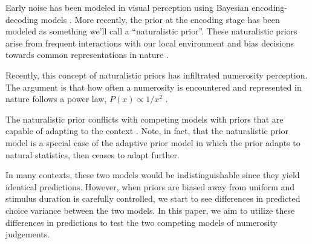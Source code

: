 Early noise has been modeled in visual perception using Bayesian encoding-decoding models \cite{wei_efficient_2012}.
More recently, the prior at the encoding stage has been modeled as something we'll call a ``naturalistic prior''. These naturalistic priors arise from frequent interactions with our local environment and bias decisions towards common representations in nature \cite{girshick_cardinal_2011}.

Recently, this concept of naturalistic priors has infiltrated numerosity perception.
The argument is that how often a numerosity is encountered and represented in nature follows a power law, $P(x) \propto 1/x^2$ \cite{cheyette_unified_2020}. %

The naturalistic prior conflicts with competing models with priors that are capable of adapting to the context \cite{prat-carrabin_efficient_2022}. %
Note, in fact, that the naturalistic prior model is a special case of the adaptive prior model in which the prior adapts to natural statistics, then ceases to adapt further.

In many contexts, these two models would be indistinguishable since they yield identical predictions.
However, when priors are biased away from uniform and stimulus duration is carefully controlled, we start to see differences in predicted choice variance between the two models.
In this paper, we aim to utilize these differences in predictions to test the two competing models of numerosity judgements.